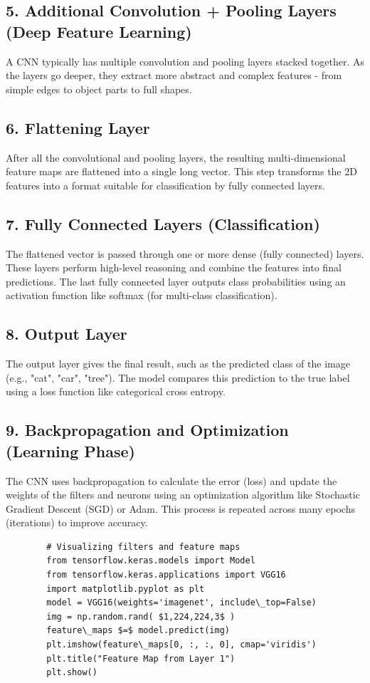 \documentclass[10pt]{article}
\begin{document}
\subsection*{5. Additional Convolution + Pooling Layers (Deep Feature Learning)}
A CNN typically has multiple convolution and pooling layers stacked together. As the layers go deeper, they extract more abstract and complex features - from simple edges to object parts to full shapes.

\subsection*{6. Flattening Layer}
After all the convolutional and pooling layers, the resulting multi-dimensional feature maps are flattened into a single long vector. This step transforms the 2D features into a format suitable for classification by fully connected layers.

\subsection*{7. Fully Connected Layers (Classification)}
The flattened vector is passed through one or more dense (fully connected) layers. These layers perform high-level reasoning and combine the features into final predictions. The last fully connected layer outputs class probabilities using an activation function like softmax (for multi-class classification).

\subsection*{8. Output Layer}
The output layer gives the final result, such as the predicted class of the image (e.g., "cat", "car", "tree"). The model compares this prediction to the true label using a loss function like categorical cross entropy.

\subsection*{9. Backpropagation and Optimization (Learning Phase)}
The CNN uses backpropagation to calculate the error (loss) and update the weights of the filters and neurons using an optimization algorithm like Stochastic Gradient Descent (SGD) or Adam. This process is repeated across many epochs (iterations) to improve accuracy.

\begin{example}
	
	\begin{verbatim}
		# Visualizing filters and feature maps
		from tensorflow.keras.models import Model
		from tensorflow.keras.applications import VGG16
		import matplotlib.pyplot as plt
		model = VGG16(weights='imagenet', include\_top=False)
		img = np.random.rand( $1,224,224,3$ )
		feature\_maps $=$ model.predict(img)
		plt.imshow(feature\_maps[0, :, :, 0], cmap='viridis')
		plt.title("Feature Map from Layer 1")
		plt.show()
	\end{verbatim}
\end{example}
\end{document}

